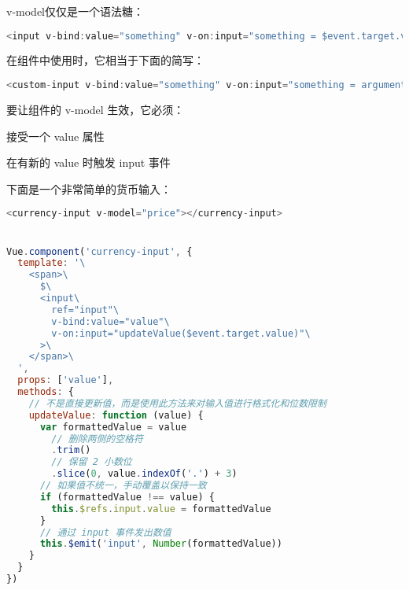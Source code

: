 v-model仅仅是一个语法糖：

\begin{lstlisting}[language=JavaScript]
<input v-bind:value="something" v-on:input="something = $event.target.value">
\end{lstlisting}

在组件中使用时，它相当于下面的简写：

\begin{lstlisting}[language=JavaScript]
<custom-input v-bind:value="something" v-on:input="something = arguments[0]"></custom-input>
\end{lstlisting}

要让组件的 v-model 生效，它必须：

\begin{compactitem}
\item 接受一个 value 属性
\item 在有新的 value 时触发 input 事件
\end{compactitem}

下面是一个非常简单的货币输入：

\begin{lstlisting}[language=JavaScript]
<currency-input v-model="price"></currency-input>


Vue.component('currency-input', {
  template: '\
    <span>\
      $\
      <input\
        ref="input"\
        v-bind:value="value"\
        v-on:input="updateValue($event.target.value)"\
      >\
    </span>\
  ',
  props: ['value'],
  methods: {
    // 不是直接更新值，而是使用此方法来对输入值进行格式化和位数限制
    updateValue: function (value) {
      var formattedValue = value
        // 删除两侧的空格符
        .trim()
        // 保留 2 小数位
        .slice(0, value.indexOf('.') + 3)
      // 如果值不统一，手动覆盖以保持一致
      if (formattedValue !== value) {
        this.$refs.input.value = formattedValue
      }
      // 通过 input 事件发出数值
      this.$emit('input', Number(formattedValue))
    }
  }
})
\end{lstlisting}







\begin{lstlisting}[language=JavaScript]

\end{lstlisting}




\begin{lstlisting}[language=JavaScript]

\end{lstlisting}



